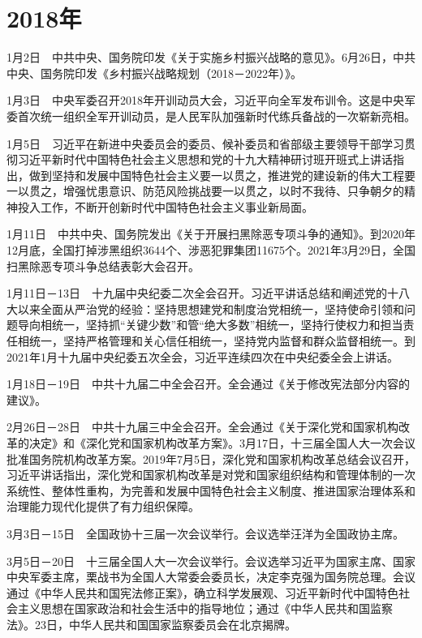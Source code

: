\documentclass[10pt,a4paper,twocolumn]{book}
\begin{document}
\section{2018年}

1月2日　中共中央、国务院印发《关于实施乡村振兴战略的意见》。6月26日，中共中央、国务院印发《乡村振兴战略规划（2018－2022年）》。

1月3日　中央军委召开2018年开训动员大会，习近平向全军发布训令。这是中央军委首次统一组织全军开训动员，是人民军队加强新时代练兵备战的一次崭新亮相。

1月5日　习近平在新进中央委员会的委员、候补委员和省部级主要领导干部学习贯彻习近平新时代中国特色社会主义思想和党的十九大精神研讨班开班式上讲话指出，做到坚持和发展中国特色社会主义要一以贯之，推进党的建设新的伟大工程要一以贯之，增强忧患意识、防范风险挑战要一以贯之，以时不我待、只争朝夕的精神投入工作，不断开创新时代中国特色社会主义事业新局面。

1月11日　中共中央、国务院发出《关于开展扫黑除恶专项斗争的通知》。到2020年12月底，全国打掉涉黑组织3644个、涉恶犯罪集团11675个。2021年3月29日，全国扫黑除恶专项斗争总结表彰大会召开。

1月11日－13日　十九届中央纪委二次全会召开。习近平讲话总结和阐述党的十八大以来全面从严治党的经验：坚持思想建党和制度治党相统一，坚持使命引领和问题导向相统一，坚持抓“关键少数”和管“绝大多数”相统一，坚持行使权力和担当责任相统一，坚持严格管理和关心信任相统一，坚持党内监督和群众监督相统一。到2021年1月十九届中央纪委五次全会，习近平连续四次在中央纪委全会上讲话。

1月18日－19日　中共十九届二中全会召开。全会通过《关于修改宪法部分内容的建议》。

2月26日－28日　中共十九届三中全会召开。全会通过《关于深化党和国家机构改革的决定》和《深化党和国家机构改革方案》。3月17日，十三届全国人大一次会议批准国务院机构改革方案。2019年7月5日，深化党和国家机构改革总结会议召开，习近平讲话指出，深化党和国家机构改革是对党和国家组织结构和管理体制的一次系统性、整体性重构，为完善和发展中国特色社会主义制度、推进国家治理体系和治理能力现代化提供了有力组织保障。

3月3日－15日　全国政协十三届一次会议举行。会议选举汪洋为全国政协主席。

3月5日－20日　十三届全国人大一次会议举行。会议选举习近平为国家主席、国家中央军委主席，栗战书为全国人大常委会委员长，决定李克强为国务院总理。会议通过《中华人民共和国宪法修正案》，确立科学发展观、习近平新时代中国特色社会主义思想在国家政治和社会生活中的指导地位；通过《中华人民共和国监察法》。23日，中华人民共和国国家监察委员会在北京揭牌。
\end{document}
